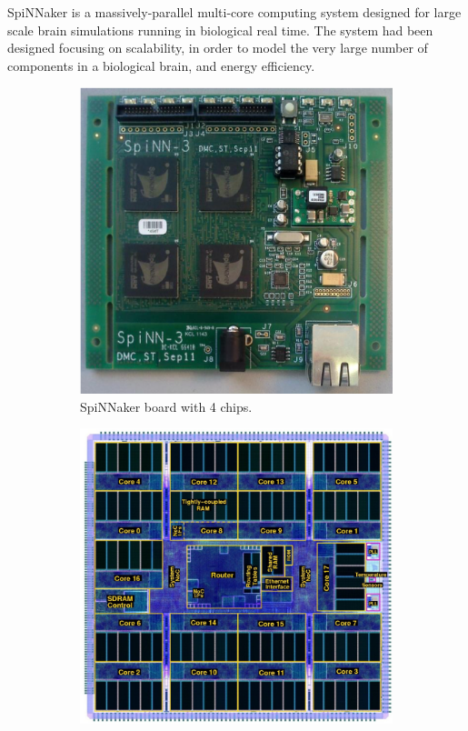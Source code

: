 SpiNNaker is a massively-parallel multi-core computing system designed for large scale brain simulations running in biological real time. The system had been designed focusing on scalability, in order to model the very large number of components in a biological brain, and energy efficiency.

\begin{figure}[ht]
\centering
\begin{subfigure}{0.45\textwidth}
\includegraphics[width=\textwidth]{images/spinnaker_board.png} 
\caption{SpiNNaker board with 4 chips.}
\label{fig:spinnaker_board}
\end{subfigure}
\begin{subfigure}{0.45\textwidth}
\includegraphics[width=\textwidth]{images/spinnaker_chip.png}

\end{subfigure}
\end{figure}
